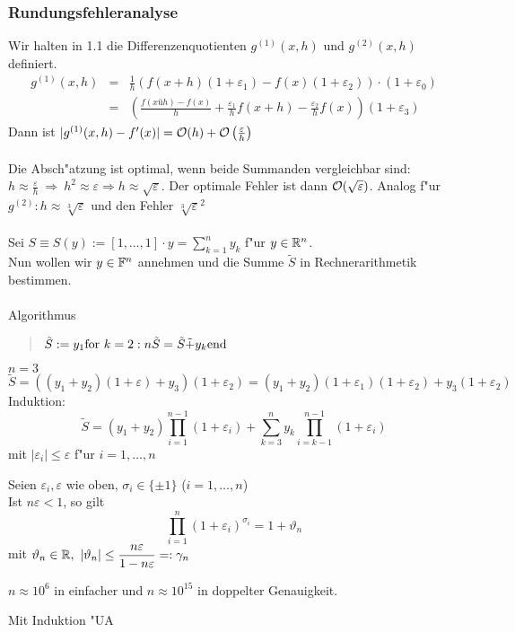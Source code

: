 \documentclass{scrartcl}
\begin{document}
\subsubsection{Rundungsfehleranalyse}
Wir halten in 1.1 die Differenzenquotienten $g^{(1)} (x,h)$ und $g^{(2)} (x,h)$ definiert. 
\begin{eqnarray*}
g^{(1)} (x,h) & = & \frac{1}{h} \left( f(x+h)(1 + \varepsilon_1) - f(x) (1+ \varepsilon_2) \right) \cdot (1+ \varepsilon_0) \\
& = & \left( \frac{f(xüh) - f(x)}{h} + \frac{\varepsilon_1}{h} f(x+h) - \frac{\varepsilon_2}{h} f(x) \right) (1+ \varepsilon_3)
\end{eqnarray*}
Dann ist $\vert g^{(1)} (x,h) - f'(x) \vert = \mathcal{O}(h) + \mathcal{O} \left( \frac{\varepsilon}{h} \right)$ \\ \\
Die Absch"atzung ist optimal, wenn beide Summanden vergleichbar sind: $h \approx \frac{\varepsilon}{h} \ \Rightarrow \ h^2 \approx \varepsilon \Rightarrow h \approx \sqrt{\varepsilon}$. Der optimale Fehler ist dann $\mathcal{O} ( \sqrt{\varepsilon})$. Analog f"ur $g^{(2)}: h \approx \sqrt[3]{\varepsilon}$ und den Fehler $\sqrt[3]{\varepsilon}^2$ \\ \\
 Sei $S \equiv S(y) := [ 1, \ldots, 1 ] \cdot y = \sum\limits_{k=1}^n y_k$ f"ur $y \in \mathbb{R}^n$. \\
Nun wollen wir $y \in \mathbb{F}^n$ annehmen und die Summe $\tilde{S}$ in Rechnerarithmetik bestimmen.  \\ \\
Algorithmus 
\begin{quote}$
\tilde{S} := y_1 \\
\mathrm{for \ } k=2:n \\
\tilde{S} = \tilde{S} \tilde+ y_k \\
\mathrm{end}$
\end{quote} 
 $n=3$ \\
$$\tilde{S} = ((y_1 + y_2)(1+\varepsilon) + y_3)(1 + \varepsilon_2) = (y_1 + y_2)(1 + \varepsilon_1)(1+ \varepsilon_2) + y_3(1+ \varepsilon_2)$$
Induktion: \\
$$\tilde{S} = (y_1 + y_2) \prod\limits_{i=1}^{n-1} (1 + \varepsilon_i) + \sum\limits_{k=3}^n y_k \prod\limits_{i=k-1}^{n-1} (1 + \varepsilon_i)$$ mit $\vert \varepsilon_i \vert \leq \varepsilon$ f"ur $i =1, \ldots, n$

\begin{Lemma}
Seien $\varepsilon_i, \varepsilon$ wie oben, $\sigma_i \in \{ \pm 1 \}$ ($i = 1, \ldots, n$) \\
Ist $n \varepsilon < 1$, so gilt
$$\prod\limits_{i=1}^n (1+\varepsilon_i)^{\sigma_i} = 1 + \vartheta_n$$
mit $\displaystyle \vartheta_n \in \RR, \ \vert \vartheta_n \vert \leq \frac{n \varepsilon}{1- n \varepsilon} =: \gamma_n$
\end{Lemma}
$n \approx 10^6$ in einfacher und $n \approx 10^{15}$ in doppelter Genauigkeit.
\begin{Bew}
Mit Induktion "UA
\end{Bew}
\end{document}
